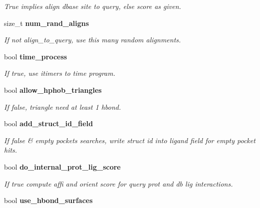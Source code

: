 \begin{CompactItemize}
\begin{CompactList}\small\item\em True implies align dbase site to query, else score as given. \item\end{CompactList}\item 
size\_\-t \bf{num\_\-rand\_\-aligns}\label{classSimSite3D_1_1SearchParameters_019cff6f0e6b9d6028f7e9fab62e62b6}

\begin{CompactList}\small\item\em If not align\_\-to\_\-query, use this many random alignments. \item\end{CompactList}\item 
bool \bf{time\_\-process}\label{classSimSite3D_1_1SearchParameters_7ed54b1f8513ddd3e56686c36fb0f89d}

\begin{CompactList}\small\item\em If true, use itimers to time program. \item\end{CompactList}\item 
bool \bf{allow\_\-hphob\_\-triangles}\label{classSimSite3D_1_1SearchParameters_a9d1bb630cda4fe759f4299354cef05f}

\begin{CompactList}\small\item\em If false, triangle need at least 1 hbond. \item\end{CompactList}\item 
bool \bf{add\_\-struct\_\-id\_\-field}\label{classSimSite3D_1_1SearchParameters_6dbd7bf284c1dbfd2c2af2becf89a078}

\begin{CompactList}\small\item\em If false \& empty pockets searches, write struct id into ligand field for empty pocket hits. \item\end{CompactList}\item 
bool \bf{do\_\-internal\_\-prot\_\-lig\_\-score}\label{classSimSite3D_1_1SearchParameters_96a5af359501d56a5670d49c32467994}

\begin{CompactList}\small\item\em If true compute affi and orient score for query prot and db lig interactions. \item\end{CompactList}\item 
bool \bf{use\_\-hbond\_\-surfaces}\label{classSimSite3D_1_1SearchParameters_1c517ad691e1606cce4cdfac986067b0}


\end{CompactItemize}
